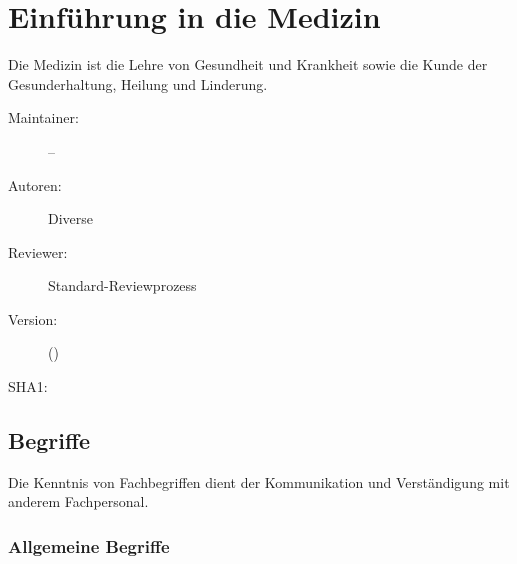 \def\ChapterCode{EIN}
\chapter
[\CO{[EIN]} Einführung in die Medizin]
{Einführung in die Medizin}
\label{chp:EIN}

\ChapterIntro
{%
Die Medizin ist die Lehre von Gesundheit und
Krankheit sowie die Kunde der Gesunderhaltung, Heilung und
Linderung.
}
{%
\begin{description}
  \item[Maintainer:] --
  \item[Autoren:] Diverse
  \item[Reviewer:] Standard-Reviewprozess
  \item[Version:] {\DocVersion} ({\DocVersionInfo})
  \item[SHA1:] {\DocGitCommit}
\end{description}

{\TxTeilkapitelAASS}
}



\clearpage %
\section{Begriffe}

\nocite{BrockhausDrei1Bd2}
\nocite{BrockhausDrei2Bd2}
\nocite{BrockhausDrei3Bd2}
\nocite{BertelsmannVolkslexikon25}
\nocite{Pschy259}

Die Kenntnis von Fachbegriffen dient der Kommunikation und
Verständigung mit anderem Fachpersonal.



\subsection{Allgemeine Begriffe}


% 


